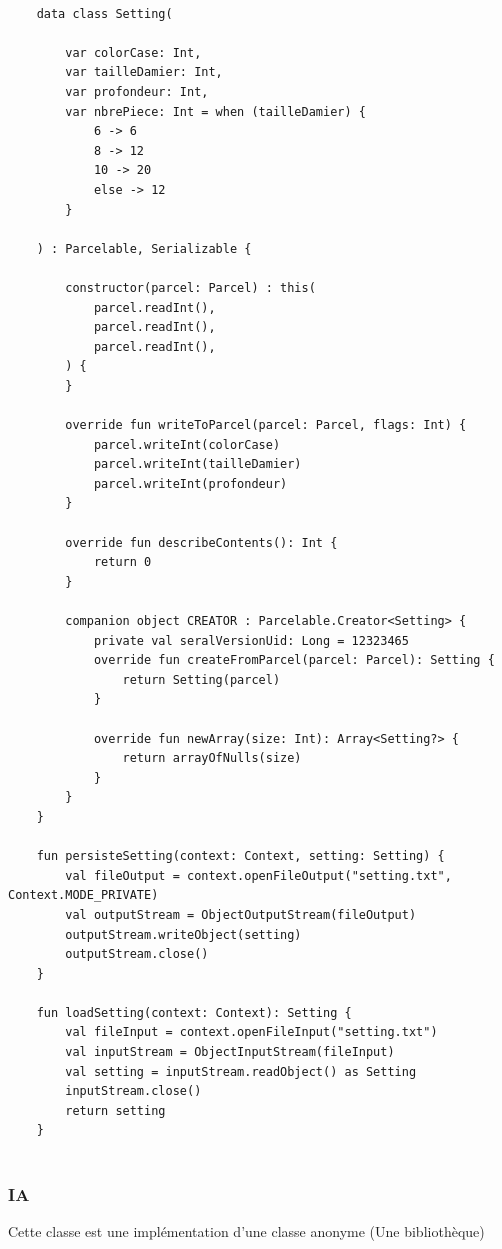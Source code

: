 \documentclass{article}
\begin{document}
  \begin{verbatim}
    
    data class Setting(
    
        var colorCase: Int,
        var tailleDamier: Int,
        var profondeur: Int,
        var nbrePiece: Int = when (tailleDamier) {
            6 -> 6
            8 -> 12
            10 -> 20
            else -> 12
        }
    
    ) : Parcelable, Serializable {
    
        constructor(parcel: Parcel) : this(
            parcel.readInt(),
            parcel.readInt(),
            parcel.readInt(),
        ) {
        }
    
        override fun writeToParcel(parcel: Parcel, flags: Int) {
            parcel.writeInt(colorCase)
            parcel.writeInt(tailleDamier)
            parcel.writeInt(profondeur)
        }
    
        override fun describeContents(): Int {
            return 0
        }
    
        companion object CREATOR : Parcelable.Creator<Setting> {
            private val seralVersionUid: Long = 12323465
            override fun createFromParcel(parcel: Parcel): Setting {
                return Setting(parcel)
            }
    
            override fun newArray(size: Int): Array<Setting?> {
                return arrayOfNulls(size)
            }
        }
    }

    fun persisteSetting(context: Context, setting: Setting) {
        val fileOutput = context.openFileOutput("setting.txt", Context.MODE_PRIVATE)
        val outputStream = ObjectOutputStream(fileOutput)
        outputStream.writeObject(setting)
        outputStream.close()
    }

    fun loadSetting(context: Context): Setting {
        val fileInput = context.openFileInput("setting.txt")
        val inputStream = ObjectInputStream(fileInput)
        val setting = inputStream.readObject() as Setting
        inputStream.close()
        return setting
    }
    

  \end{verbatim}

  \subsubsection{IA}

  Cette classe est une implémentation d'une classe anonyme (Une bibliothèque)
\end{document}
